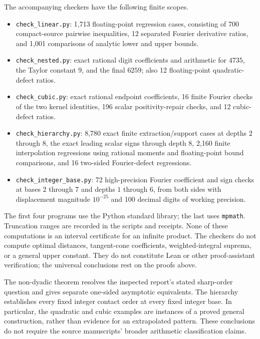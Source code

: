 \documentclass[11pt,letterpaper]{article}
\theoremstyle{remark}\newtheorem{remark}[theorem]{Remark}
\begin{document}
The accompanying checkers have the following finite scopes.
\nopagebreak[4]
\begin{itemize}
\item \texttt{check\_linear.py}: 1,713 floating-point regression cases, consisting of 700 compact-source pairwise inequalities, 12 separated Fourier derivative ratios, and 1,001 comparisons of analytic lower and upper bounds.
\item \texttt{check\_nested.py}: exact rational digit coefficients and arithmetic for $4735$, the Taylor constant $9$, and the final $6259$; also 12 floating-point quadratic-defect ratios.
\item \texttt{check\_cubic.py}: exact rational endpoint coefficients, 16 finite Fourier checks of the two kernel identities, 196 scalar positivity-repair checks, and 12 cubic-defect ratios.
\item \texttt{check\_hierarchy.py}: 8,780 exact finite extraction/support cases at depths $2$ through $8$, the exact leading scalar signs through depth $8$, 2,160 finite interpolation regressions using rational moments and floating-point bound comparisons, and 16 two-sided Fourier-defect regressions.
\item \texttt{check\_integer\_base.py}: 72 high-precision Fourier coefficient and sign checks at bases $2$ through $7$ and depths $1$ through $6$, from both sides with displacement magnitude $10^{-25}$ and 100 decimal digits of working precision.
\end{itemize}
The first four programs use the Python standard library; the last uses \texttt{mpmath}. Truncation ranges are recorded in the scripts and receipts. None of these computations is an interval certificate for an infinite product. The checkers do not compute optimal distances, tangent-cone coefficients, weighted-integral suprema, or a general upper constant. They do not constitute Lean or other proof-assistant verification; the universal conclusions rest on the proofs above.

The non-dyadic theorem resolves the inspected report's stated sharp-order question and gives separate one-sided asymptotic equivalents. The hierarchy establishes every fixed integer contact order at every fixed integer base. In particular, the quadratic and cubic examples are instances of a proved general construction, rather than evidence for an extrapolated pattern. These conclusions do not require the source manuscripts' broader arithmetic classification claims.
\end{document}
